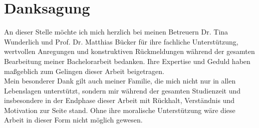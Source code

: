 \section*{Danksagung}

An dieser Stelle möchte ich mich herzlich bei meinen Betreuern Dr. Tina Wunderlich und Prof. Dr. Matthias Bücker für ihre fachliche Unterstützung, wertvollen Anregungen und konstruktiven Rückmeldungen während der gesamten Bearbeitung meiner Bachelorarbeit bedanken. Ihre Expertise und Geduld haben maßgeblich zum Gelingen dieser Arbeit beigetragen.\\

\noindent Mein besonderer Dank gilt auch meiner Familie, die mich nicht nur in allen Lebenslagen unterstützt, sondern mir während der gesamten Studienzeit und insbesondere in der Endphase dieser Arbeit mit Rückhalt, Verständnis und Motivation zur Seite stand. Ohne ihre moralische Unterstützung wäre diese Arbeit in dieser Form nicht möglich gewesen.